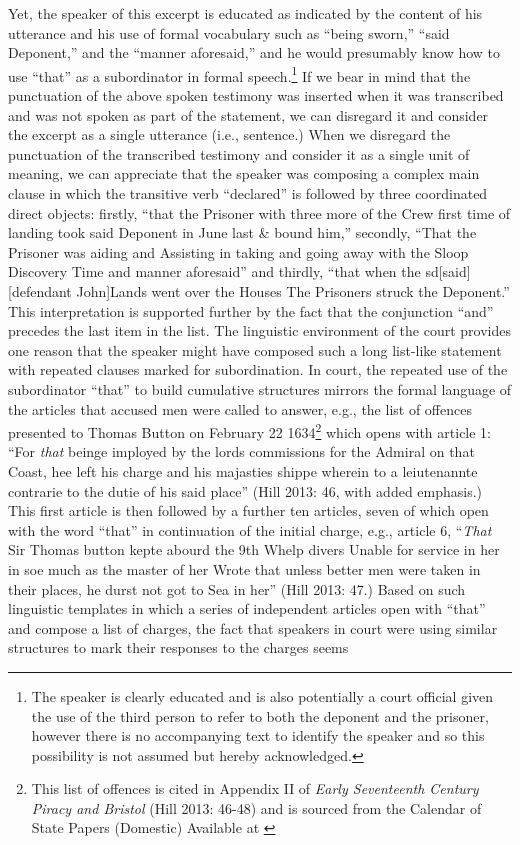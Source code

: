 \begin{styleStandard}
Yet, the speaker of this excerpt is educated as indicated by the content of his utterance and his use of formal vocabulary such as “being sworn,” “said Deponent,” and the “manner aforesaid,” and he would presumably know how to use “that” as a subordinator in formal speech.\footnote{ The speaker is clearly educated and is also potentially a court official given the use of the third person to refer to both the deponent and the prisoner, however there is no accompanying text to identify the speaker and so this possibility is not assumed but hereby acknowledged.} If we bear in mind that the punctuation of the above spoken testimony was inserted when it was transcribed and was not spoken as part of the statement, we can disregard it and consider the excerpt as a single utterance (i.e., sentence.) When we disregard the punctuation of the transcribed testimony and consider it as a single unit of meaning, we can appreciate that the speaker was composing a complex main clause in which the transitive verb “declared” is followed by three coordinated direct objects: firstly, “that\textit{ }the Prisoner with three more of the Crew first time of landing took said Deponent in June last \& bound him,” secondly, “That the Prisoner was aiding and Assisting in taking and going away with the Sloop Discovery Time and manner aforesaid” and thirdly, “that when the sd[said] [defendant John]Lands went over the Houses The Prisoners struck the Deponent.” This interpretation is supported further by the fact that the conjunction “and” precedes the last item in the list. The linguistic environment of the court provides one reason that the speaker might have composed such a long list-like statement with repeated clauses marked for subordination. In court, the repeated use of the subordinator “that” to build cumulative structures mirrors the formal language of the articles that accused men were called to answer, e.g., the list of offences presented to Thomas Button on February 22 1634\footnote{ This list of offences is cited in Appendix II of \textit{Early Seventeenth Century Piracy and Bristol} (Hill 2013: 46-48) and is sourced from the Calendar of State Papers (Domestic) Available at \href{http://www.british-history.ac.uk/}{}\par } which opens with article 1: “For\textit{ that} beinge imployed by the lords commissions for the Admiral on that Coast, hee left his charge and his majasties shippe wherein to a leiutenannte contrarie to the dutie of his said place” (Hill 2013: 46, with added emphasis.) This first article is then followed by a further ten articles, seven of which open with the word “that” in continuation of the initial charge, e.g., article 6, “\textit{That }Sir Thomas button kepte abourd the 9th Whelp divers Unable for service in her in soe much as the master of her Wrote that unless better men were taken in their places, he durst not got to Sea in her” (Hill 2013: 47.) Based on such linguistic templates in which a series of independent articles open with “that” and compose a list of charges, the fact that speakers in court were using similar structures to mark their responses to the charges seems 
\end{styleStandard}
